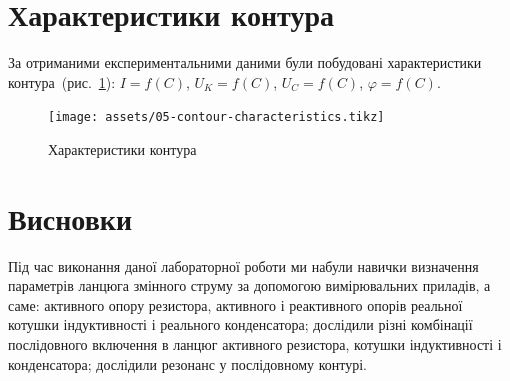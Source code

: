 \documentclass[a4paper,oneside,DIV=12,12pt]{scrartcl}
\newcommand\schel[1]{\textit{#1}}
\begin{document}
			
			
		\section{Характеристики контура}
			За отриманими експериментальними даними були побудовані характеристики контура~(рис.~\ref{fig:05-contour-characteristics}): $I = f(C)$, $U_K = f(C)$, $U_C = f(C)$, $\varphi = f(C)$.
			\begin{figure}[!htbp]
			\centering
				\texttt{[image: assets/05-contour-characteristics.tikz]}
			\caption{Характеристики контура}
			\label{fig:05-contour-characteristics}
			\end{figure}
			
	\section{Висновки}
		Під час виконання даної лабораторної роботи ми набули навички визначення параметрів ланцюга змінного струму за допомогою вимірювальних приладів, а саме: активного опору резистора, активного і реактивного опорів реальної котушки індуктивності і реального конденсатора; дослідили різні комбінації послідовного включення в ланцюг активного резистора, котушки індуктивності і конденсатора; дослідили резонанс у послідовному контурі.
\end{document}
